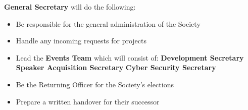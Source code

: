 \item \textbf{General Secretary} will do the following:
\begin{itemize}
  \item Be responsible for the general administration of the Society
  \item Handle any incoming requests for projects
  \item Lead the \textbf{Events Team} which will consist of:
    \subitem \textbf{Development Secretary}
    \subitem \textbf{Speaker Acquisition Secretary}
    \subitem \textbf{Cyber Security Secretary}
  \item Be the Returning Officer for the Society's elections
  \item Prepare a written handover for their successor
\end{itemize}